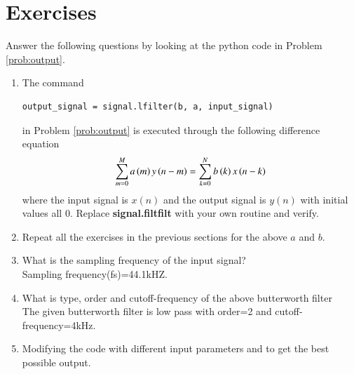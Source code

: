\documentclass[journal,12pt,twocolumn]{IEEEtran}
\renewcommand\thesection{\arabic{section}}
\begin{document}
\section{Exercises}
Answer the following questions by looking at the python code in Problem \ref{prob:output}.
\begin{enumerate}[label=\thesection.\arabic*]
	\item
	The command
	\begin{lstlisting}
output_signal = signal.lfilter(b, a, input_signal)
	\end{lstlisting}
	in Problem \ref{prob:output} is executed through the following difference equation
	\begin{equation}
		\label{eq:iir_filter_gen}
		\sum _{m=0}^{M}a\left(m\right)y\left(n-m\right)=\sum _{k=0}^{N}b\left(k\right)x\left(n-k\right)
	\end{equation}
	where the input signal is $x(n)$ and the output signal is $y(n)$ with initial values all 0. Replace
	\textbf{signal.filtfilt} with your own routine and verify.
	\item Repeat all the exercises in the previous sections for the above $a$ and $b$.
	\item What is the sampling frequency of the input signal?
	\\
	\solution
	Sampling frequency(fs)=44.1kHZ.
	\item
	What is type, order and  cutoff-frequency of the above butterworth filter
	\\
	\solution
	The given butterworth filter is low pass with order=2 and cutoff-frequency=4kHz.
	\item
	Modifying the code with different input parameters and to get the best possible output.
\end{enumerate}
\end{document}
